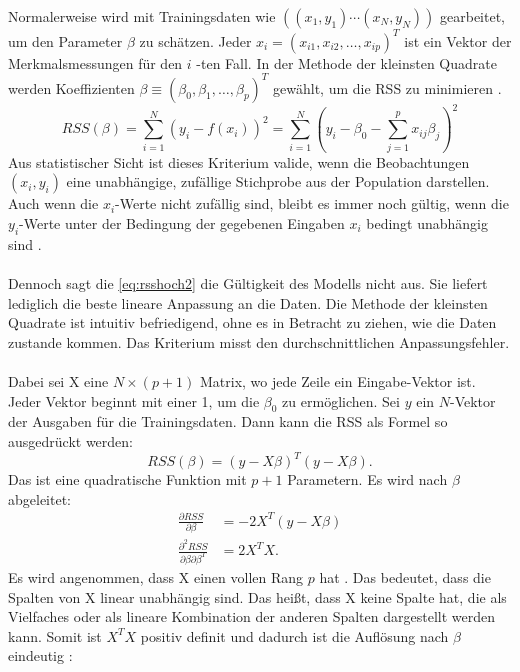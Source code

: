 Normalerweise wird mit Trainingsdaten wie \( ( (x_1, y_1) \cdots (x_N, y_N) ) \) gearbeitet, um den Parameter $\beta$ zu schätzen. Jeder \( x_i = (x_{i1}, x_{i2}, \ldots, x_{ip})^T \) ist ein Vektor der Merkmalsmessungen für den \(i\) -ten Fall. In der Methode der kleinsten Quadrate werden Koeffizienten \( \beta \equiv (\beta_0, \beta_1, \ldots, \beta_p)^T \) gewählt, um die \ac{RSS} zu minimieren \cite{hastie2009elements}. 
\begin{equation}
RSS(\beta) = \sum_{i=1}^{N} (y_i - f(x_i))^2 
= \sum_{i=1}^{N} \left( y_i - \beta_0 - \sum_{j=1}^{p} x_{ij} \beta_j \right)^2
\label{eq:rsshoch2}
\end{equation}
Aus statistischer Sicht ist dieses Kriterium valide, wenn die Beobachtungen \( (x_i, y_i) \) eine unabhängige, zufällige Stichprobe aus der Population darstellen. Auch wenn die \(x_i\)-Werte nicht zufällig sind, bleibt es immer noch gültig, wenn die \(y_i\)-Werte unter der Bedingung der gegebenen Eingaben \(x_i\) bedingt unabhängig sind \cite{hastie2009elements}.  \\\\
Dennoch sagt die \autoref{eq:rsshoch2} die Gültigkeit des Modells nicht aus. Sie liefert lediglich die beste lineare Anpassung an die Daten. Die Methode der kleinsten Quadrate ist intuitiv befriedigend, ohne es in Betracht zu ziehen, wie die Daten zustande kommen. Das Kriterium misst den durchschnittlichen Anpassungsfehler. \\\\
Dabei sei X eine \( N \times (p + 1) \) Matrix, wo jede Zeile ein Eingabe-Vektor ist. Jeder Vektor beginnt mit einer 1, um die $\beta_0$ zu ermöglichen. Sei \(y\) ein \(N\)-Vektor der Ausgaben für die Trainingsdaten. Dann kann die \ac{RSS} als Formel so ausgedrückt werden: 
\begin{equation}
RSS(\beta) = (y - X\beta)^T (y - X\beta).
\label{eq:RSSmatrix}
\end{equation}
Das ist eine quadratische Funktion mit \(p + 1\) Parametern. Es wird nach $\beta$ abgeleitet:
\begin{equation}
\begin{aligned}
\frac{\partial RSS}{\partial \beta} &= -2 X^T (y - X\beta) \\
\frac{\partial^2 RSS}{\partial \beta \partial \beta^T} &= 2 X^T X.
\end{aligned}
\label{eq:RSSableitung}
\end{equation}
Es wird angenommen, dass X einen vollen Rang \(p\) hat \cite{huber1981robust}. Das bedeutet, dass die Spalten von X linear unabhängig sind. Das heißt, dass X keine Spalte hat, die als Vielfaches oder als lineare Kombination der anderen Spalten dargestellt werden kann.  Somit ist \( X^T X \) positiv definit und dadurch ist die Auflösung nach $\beta$ eindeutig \cite{hastie2009elements}: 
